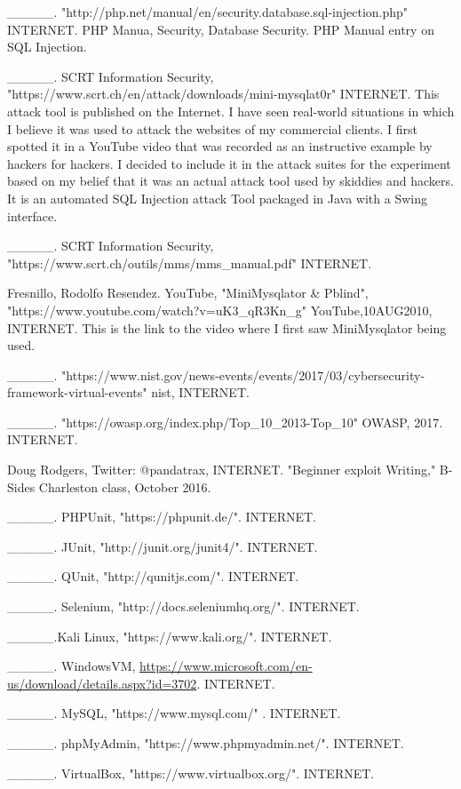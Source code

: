 \_\_\_\_\_. "http://php.net/manual/en/security.database.sql-injection.php" INTERNET. PHP Manua, Security, Database Security. PHP Manual entry on SQL Injection.

\_\_\_\_\_. SCRT Information Security, "https://www.scrt.ch/en/\gls{attack}/downloads/mini-mysqlat0r" INTERNET. This \gls{attack} tool is published on the Internet. I have seen real-world situations in which I believe it was used to \gls{attack} the websites of my commercial clients. I first spotted it in a YouTube video that was recorded as an instructive example by hackers for hackers. I decided to include it in the \gls{attack} suites for the experiment based on my belief that it was an actual \gls{attack} tool used by skiddies and hackers. It is an automated SQL Injection \gls{attack} Tool packaged in Java with a Swing interface.

\_\_\_\_\_. SCRT Information Security, "https://www.scrt.ch/outils/mms/mms\_manual.pdf" INTERNET.

Fresnillo, Rodolfo Resendez. YouTube, "MiniMysqlator \& Pblind", "https://www.youtube.com/watch?v=uK3\_qR3Kn\_g" YouTube,10AUG2010, INTERNET. This is the link to the video where I first saw MiniMysqlator being used.

\_\_\_\_\_. "https://www.nist.gov/news-events/events/2017/03/cybersecurity-framework-virtual-events" \gls{nist}, INTERNET.

\_\_\_\_\_. "https://owasp.org/index.php/Top\_10\_2013-Top\_10" OWASP, 2017. INTERNET.

Doug Rodgers, Twitter: @pandatrax, INTERNET. "Beginner \gls{exploit} Writing," B-Sides Charleston class, October 2016.

\_\_\_\_\_. PHPUnit, "https://phpunit.de/". INTERNET.

\_\_\_\_\_. JUnit, "http://junit.org/junit4/". INTERNET.

\_\_\_\_\_. QUnit, "http://qunitjs.com/". INTERNET.

\_\_\_\_\_. Selenium, "http://docs.seleniumhq.org/". INTERNET.

\_\_\_\_\_.Kali Linux, "https://www.kali.org/". INTERNET.

\_\_\_\_\_. WindowsVM, \url{https://www.microsoft.com/en-us/download/details.aspx?id=3702}. INTERNET.

\_\_\_\_\_. MySQL, "https://www.mysql.com/" . INTERNET.

\_\_\_\_\_. phpMyAdmin, "https://www.phpmyadmin.net/". INTERNET.

\_\_\_\_\_. VirtualBox, "https://www.virtualbox.org/". INTERNET.

